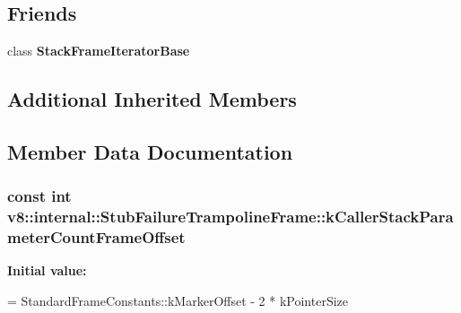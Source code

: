 \subsection*{Friends}
\begin{DoxyCompactItemize}
\item 
\hypertarget{classv8_1_1internal_1_1_stub_failure_trampoline_frame_ac7310421866976ca454bbe11c5f926c3}{}class {\bfseries Stack\+Frame\+Iterator\+Base}\label{classv8_1_1internal_1_1_stub_failure_trampoline_frame_ac7310421866976ca454bbe11c5f926c3}

\end{DoxyCompactItemize}
\subsection*{Additional Inherited Members}


\subsection{Member Data Documentation}
\hypertarget{classv8_1_1internal_1_1_stub_failure_trampoline_frame_a9deb7bbc879d099cffb0b72d03ec1b20}{}
\subsubsection[{k\+Caller\+Stack\+Parameter\+Count\+Frame\+Offset}]{\setlength{\rightskip}{0pt plus 5cm}const int v8\+::internal\+::\+Stub\+Failure\+Trampoline\+Frame\+::k\+Caller\+Stack\+Parameter\+Count\+Frame\+Offset\hspace{0.3cm}{\ttfamily [static]}}\label{classv8_1_1internal_1_1_stub_failure_trampoline_frame_a9deb7bbc879d099cffb0b72d03ec1b20}
{\bfseries Initial value\+:}
\begin{DoxyCode}
=
      StandardFrameConstants::kMarkerOffset - 2 * kPointerSize
\end{DoxyCode}
\hypertarget{classv8_1_1internal_1_1_stub_failure_trampoline_frame_a720c3702483b59a9f3bedb5ceca05d2e}{}

